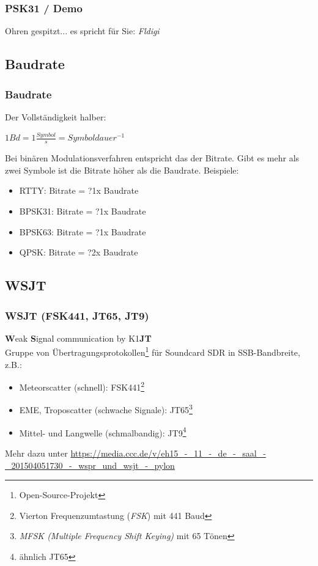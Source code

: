 \begin{frame}
    \frametitle{PSK31 / Demo}

    \Large{Ohren gespitzt... es spricht für Sie: \emph{Fldigi}}

\end{frame}

\subsection{Baudrate}

\begin{frame}
    \frametitle{Baudrate}

    Der Vollständigkeit halber: \\[2em]

    \begin{center}
        $1 Bd = 1 \frac{Symbol}{s} = Symboldauer^{-1}$
    \end{center}

    Bei binären Modulationsverfahren entspricht das der Bitrate. Gibt es mehr
    als zwei Symbole ist die Bitrate höher als die Baudrate. Beispiele:

    \begin{itemize}
        \item RTTY: Bitrate = ?1x Baudrate
        \item BPSK31: Bitrate = ?1x Baudrate
        \item BPSK63: Bitrate = ?1x Baudrate
        \item QPSK: Bitrate = ?2x Baudrate
    \end{itemize}

\end{frame}

\subsection{WSJT}

\begin{frame}
    \frametitle{WSJT (FSK441, JT65, JT9)}

    \textbf{W}eak \textbf{S}ignal communication by K1\textbf{JT} \\[2em]

    Gruppe von Übertragungsprotokollen\footnote{Open-Source-Projekt} für
    Soundcard SDR in SSB-Bandbreite, z.B.:
    
    \begin{itemize}
        \item Meteorscatter (schnell): FSK441\footnote{Vierton Frequenzumtastung
              (\emph{FSK}) mit 441 Baud}
        \item EME, Troposcatter (schwache Signale): JT65\footnote{\emph{MFSK
              (Multiple Frequency Shift Keying)} mit 65 Tönen}
        \item Mittel- und Langwelle (schmalbandig): JT9\footnote{ähnlich JT65}
    \end{itemize}

    Mehr dazu unter \url{https://media.ccc.de/v/eh15_-_11_-_de_-_saal_-_201504051730_-_wspr_und_wsjt_-_pylon}

\end{frame}

